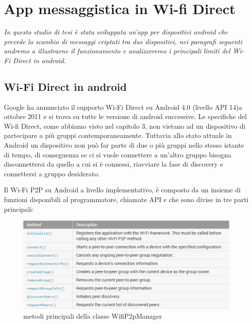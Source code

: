 


\chapter{App messaggistica in Wi-fi Direct}

\begin{minipage}{12cm}\textit{
    In questo studio 
    di tesi è stata sviluppata un'app per
   dispositivi android che prevede lo scambio di
    messaggi criptati tra due dispositivi,
   nei paragrafi seguenti andremo a illustrarne il 
   funzionamento e analizzeremo
   i principali limiti del Wi-Fi Direct in android.}
\end{minipage}




\section{Wi-Fi Direct in android}



Google ha annunciato il supporto Wi-Fi Direct su Android 4.0 (livello API 14)a ottobre 2011
\cite{wikiDi} e si trova su tutte le versione di android successive.
Le specifiche del Wi-fi Direct, come abbiamo visto nel capitolo 3,
non vietano ad un dispositivo di partecipare a più gruppi contemporaneamente.
Tuttavia allo stato attuale in Android  un dispositivo non
può far parte di due o più gruppi
nello stesso istante di tempo,
di conseguenza se ci si vuole connettere a un'altro gruppo
bisogna disconnettersi da quello a cui si è connessi, riavviare la fase di discovery
e connettersi a gruppo desiderato.

Il Wi-Fi P2P su Android a livello implementativo, è composto da un insieme di
funzioni disponibili al programmatore, chiamate API e che sono divise in tre parti
principali:

\begin{figure}
   \centering
   \caption{metodi principali della classe WifiP2pManager}
   \includegraphics[width=1\columnwidth]{imgs/wifip2pmanagerMet.jpg}
\end{figure}

